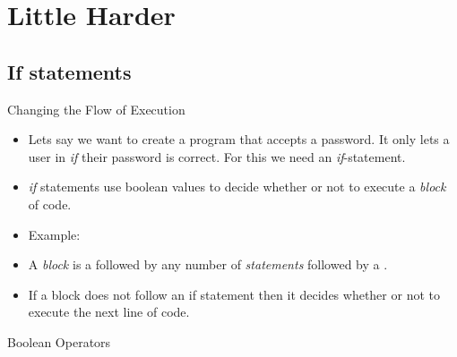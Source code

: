 
\section{Little Harder}

\subsection{If statements}
\begin{frame}[fragile]{Changing the Flow of Execution}
\begin{itemize}
\item Lets say we want to create a program that accepts a password. It only lets a user in \emph{if} their password is correct. For this we need an \emph{if}-statement.
\item \emph{if} statements use boolean values to decide whether or not to execute a \emph{block} of code.
\item Example:
\begin{semiverbatim}\end{semiverbatim}
\item A \emph{block} is a \code{\texttt{\{}} followed by any number of \emph{statements} followed by a \code{\texttt{\}}}.
\item If a block does not follow an if statement then it decides whether or not to execute the next line of code.
\end{itemize}
\end{frame}

\begin{frame}[fragile]{Boolean Operators}

\begin{semiverbatim}\end{semiverbatim}
\end{frame}

